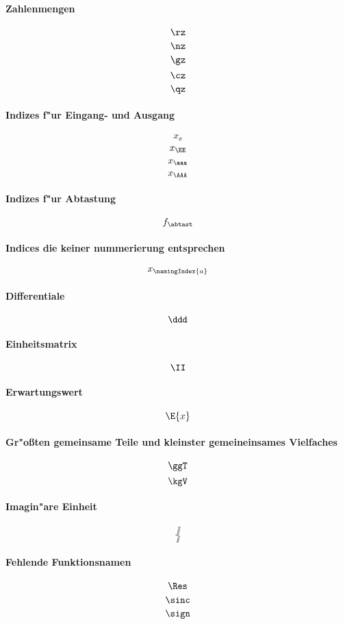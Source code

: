 \paragraph{Zahlenmengen}
$$\rz$$
$$\nz$$
$$\gz$$
$$\cz$$
$$\qz$$

\paragraph{Indizes f"ur Eingang- und Ausgang}
$$x_{\ee}$$
$$x_{\EE}$$
$$x_{\aaa}$$
$$x_{\AAA}$$

\paragraph{Indizes f"ur Abtastung}
$$f_\abtast$$

\paragraph{Indices die keiner nummerierung entsprechen}
$$x_\namingIndex{a}$$

\paragraph{Differentiale}
$$\ddd$$

\paragraph{Einheitsmatrix}
$$\II$$

\paragraph{Erwartungswert}
$$\E{x}$$

\paragraph{Gr"o{\ss}ten gemeinsame Teile und kleinster gemeineinsames Vielfaches}
$$\ggT$$
$$\kgV$$

\paragraph{Imagin"are Einheit}
$$\jj$$
$$\ii$$

\paragraph{Fehlende Funktionsnamen}
$$\Res$$
$$\sinc$$
$$\sign$$

